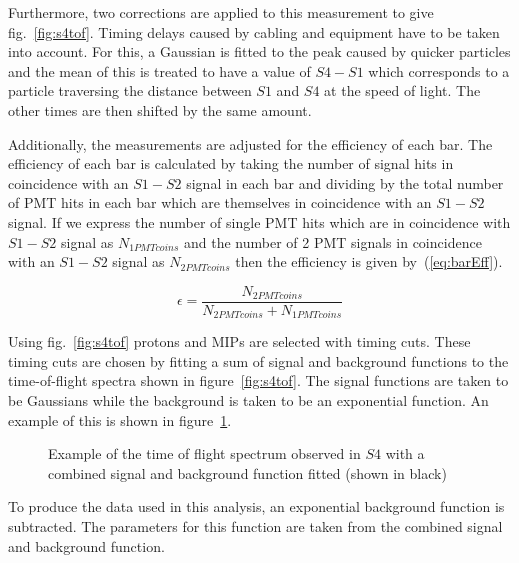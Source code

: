 	Furthermore, two corrections are applied to this measurement to give fig.~\ref{fig:s4tof}. 
	Timing delays caused by cabling and equipment have to be taken into account. 
	For this, a Gaussian is fitted to the peak caused by quicker particles and the mean of this is treated to have a value of $S4 - S1$ which corresponds to a particle traversing the distance between $S1$ and $S4$ at the speed of light. 
	The other times are then shifted by the same amount.
	
	Additionally, the measurements are adjusted for the efficiency of each bar. 
	The efficiency of each bar is calculated by taking the number of signal hits in coincidence with an $S1-S2$ signal in each bar and dividing by the total number of PMT hits in each bar which are themselves in coincidence with an $S1-S2$ signal. 
	If we express the number of single PMT hits which are in coincidence with $S1-S2$ signal as $N_{1PMTcoins}$ and the number of 2 PMT signals in coincidence with an $S1-S2$ signal as $N_{2PMTcoins}$ then the efficiency is given by~(\ref{eq:barEff}).
	
	\begin{equation}
		\epsilon = \frac{N_{2PMTcoins}}{N_{2PMTcoins}+N_{1PMTcoins}}
		\label{eq:barEff}
	\end{equation}
	
	Using fig.~\ref{fig:s4tof} protons and MIPs are selected with timing cuts. 
	These timing cuts are chosen by fitting a sum of signal and background functions to the time-of-flight spectra shown in figure~\ref{fig:s4tof}. 
	The signal functions are taken to be Gaussians while the background is taken to be an exponential function. 
	An example of this is shown in figure~\ref{fig:fitEx}.
	
	\begin{figure}[h]
		\begin{adjustbox}{max totalsize={.7\textwidth}{.62\textheight},center}
			
		\end{adjustbox}
		\caption{Example of the time of flight spectrum observed in $S4$ with a combined signal and background function fitted (shown in black)}
		\label{fig:fitEx}
	\end{figure}

	To produce the data used in this analysis, an exponential background function is subtracted. 
	The parameters for this function are taken from the combined signal and background function.

	